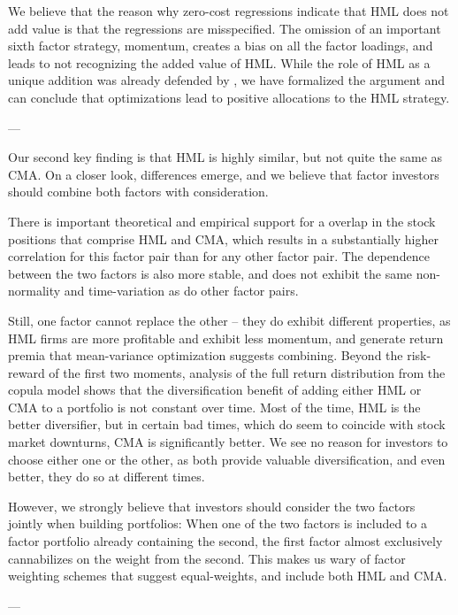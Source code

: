 We believe that the reason why zero-cost regressions indicate that HML does not add value is that the regressions are misspecified. The omission of an important sixth factor strategy, momentum, creates a bias on all the factor loadings, and leads to not recognizing the added value of HML. While the role of HML as a unique addition was already defended by \textcite{Asness2015}, we have formalized the argument and can conclude that optimizations lead to positive allocations to the HML strategy.

---

Our second key finding is that HML is highly similar, but not quite the same as CMA. On a closer look, differences emerge, and we believe that factor investors should combine both factors with consideration.

There is important theoretical and empirical support for a overlap in the stock positions that comprise HML and CMA, which results in a substantially higher correlation for this factor pair than for any other factor pair. The dependence between the two factors is also more stable, and does not exhibit the same non-normality and time-variation as do other factor pairs. 

Still, one factor cannot replace the other -- they do exhibit different properties, as HML firms are more profitable and exhibit less momentum, and generate return premia that mean-variance optimization suggests combining. Beyond the risk-reward of the first two moments, analysis of the full return distribution from the copula model shows that the diversification benefit of adding either HML or CMA to a portfolio is not constant over time. Most of the time, HML is the better diversifier, but in certain bad times, which do seem to coincide with stock market downturns, CMA is significantly better. We see no reason for investors to choose either one or the other, as both provide valuable diversification, and even better, they do so at different times.

However, we strongly believe that investors should consider the two factors jointly when building portfolios: When one of the two factors is included to a factor portfolio already containing the second, the first factor almost exclusively cannabilizes on the weight from the second. This makes us wary of factor weighting schemes that suggest equal-weights, and include both HML and CMA. 

---